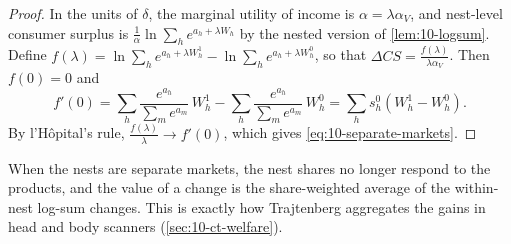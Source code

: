 \begin{proof}
In the units of $\delta$, the marginal utility of income is $\alpha = \lambda\alpha_V$, and nest-level consumer
surplus is $\frac{1}{\alpha}\ln\sum_h e^{a_h + \lambda W_h}$ by the nested version of \cref{lem:10-logsum}. Define
$f(\lambda) = \ln\sum_h e^{a_h + \lambda W^1_h} - \ln\sum_h e^{a_h + \lambda W^0_h}$, so that $\Delta CS =
\frac{f(\lambda)}{\lambda\alpha_V}$. Then $f(0) = 0$ and
\begin{equation*}
f'(0) = \sum_h \frac{e^{a_h}}{\sum_m e^{a_m}}\,W^1_h - \sum_h \frac{e^{a_h}}{\sum_m e^{a_m}}\,W^0_h
= \sum_h s^0_h\left(W^1_h - W^0_h\right).
\end{equation*}
By l'H\^opital's rule, $\frac{f(\lambda)}{\lambda}\to f'(0)$, which gives \eqref{eq:10-separate-markets}.
\end{proof}

When the nests are separate markets, the nest shares no longer respond to the products, and the value of a change
is the share-weighted average of the within-nest log-sum changes. This is exactly how Trajtenberg aggregates the
gains in head and body scanners (\cref{sec:10-ct-welfare}).

